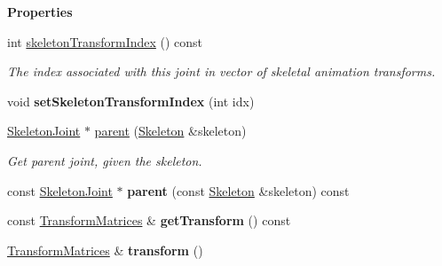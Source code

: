 \begin{Indent}\textbf{ Properties}\par
\begin{DoxyCompactItemize}
\item 
\mbox{\label{classrev_1_1_skeleton_joint_ab16d919cb01eeb789c4023dfb2e7733d}} 
int \mbox{\hyperlink{classrev_1_1_skeleton_joint_ab16d919cb01eeb789c4023dfb2e7733d}{skeleton\+Transform\+Index}} () const
\begin{DoxyCompactList}\small\item\em The index associated with this joint in vector of skeletal animation transforms. \end{DoxyCompactList}\item 
\mbox{\label{classrev_1_1_skeleton_joint_aaa4556516fdb8691eb3fdad98b00775a}} 
void {\bfseries set\+Skeleton\+Transform\+Index} (int idx)
\item 
\mbox{\label{classrev_1_1_skeleton_joint_a3042b0a8c17d44b804842dcde598605d}} 
\mbox{\hyperlink{classrev_1_1_skeleton_joint}{Skeleton\+Joint}} $\ast$ \mbox{\hyperlink{classrev_1_1_skeleton_joint_a3042b0a8c17d44b804842dcde598605d}{parent}} (\mbox{\hyperlink{classrev_1_1_skeleton}{Skeleton}} \&skeleton)
\begin{DoxyCompactList}\small\item\em Get parent joint, given the skeleton. \end{DoxyCompactList}\item 
\mbox{\label{classrev_1_1_skeleton_joint_a9af9faac41437a839c8759c800d07bc7}} 
const \mbox{\hyperlink{classrev_1_1_skeleton_joint}{Skeleton\+Joint}} $\ast$ {\bfseries parent} (const \mbox{\hyperlink{classrev_1_1_skeleton}{Skeleton}} \&skeleton) const
\item 
\mbox{\label{classrev_1_1_skeleton_joint_a99f9a360ecb41067a477d695087420bc}} 
const \mbox{\hyperlink{structrev_1_1_transform_matrices}{Transform\+Matrices}} \& {\bfseries get\+Transform} () const
\item 
\mbox{\label{classrev_1_1_skeleton_joint_aa23655d48045b7b6d23e4eba48d755f9}} 
\mbox{\hyperlink{structrev_1_1_transform_matrices}{Transform\+Matrices}} \& {\bfseries transform} ()

\end{DoxyCompactItemize}
\end{Indent}
